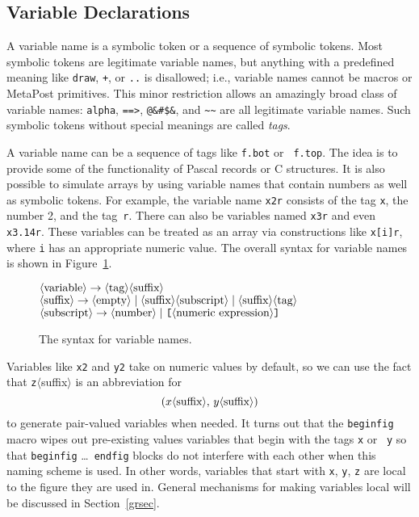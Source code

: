 \documentclass{article} %
\newcommand\descr[1]{{\langle\hbox{#1}\rangle}}
\newcommand\invisgap{\nobreak\hskip0pt\relax}
\newcommand\tdescr[1]{$\langle$\invisgap#1\invisgap$\rangle$}
\begin{document}
\subsection{Variable Declarations}
\label{vardecl}

A variable name is a symbolic token or a sequence of symbolic tokens.
Most symbolic tokens are legitimate variable names, but anything with a
predefined meaning like {\tt draw}, {\tt +}, or {\tt ..} is disallowed;
i.e., variable names cannot be macros or MetaPost primitives.  This
minor restriction allows an amazingly broad class of variable names:
{\tt alpha}, \verb|==>|, \verb|@&#$&|, and \verb|~~| are all legitimate
variable names.  Such symbolic tokens without special meanings are
called {\em tags}.

A variable name can be a sequence of tags like {\tt f.bot} or {\tt
f.top}.  The idea is to provide some of the functionality of Pascal
records or C structures.  It is also possible to simulate arrays by
using variable names that contain numbers as well as symbolic tokens.
For example, the variable name {\tt x2r} consists of the tag {\tt x},
the number 2, and the tag~{\tt r}.  There can also be variables named
{\tt x3r} and even {\tt x3.14r}.  These variables can be treated as an
array via constructions like {\tt x[i]r}, where {\tt i}
has an appropriate numeric value.  The overall syntax for variable names
is shown in Figure~\ref{syvar}.

\begin{figure}[htp]
\begin{ctabbing}
$\tt \descr{variable} \rightarrow \descr{tag}\descr{suffix}$\\
$\tt \descr{suffix} \rightarrow \descr{empty} \;|\;
        \descr{suffix}\descr{subscript} \;|\; \descr{suffix}\descr{tag}$\\
$\tt \descr{subscript} \rightarrow \descr{number} \;|\;
        \hbox{\tt [}\descr{numeric expression}\hbox{\tt ]}$
\end{ctabbing}
\caption{The syntax for variable names.}
\index{suffix?\tdescr{suffix}}\index{subscript?\tdescr{subscript}}
\label{syvar}
\end{figure}

Variables like {\tt x2} and {\tt y2} take on numeric values by default, so we
can use the fact that {\tt z}\tdescr{suffix} is an abbreviation for\label{Dzconv}
$$ (x\descr{suffix},\, y\descr{suffix}) $$
to generate pair-valued variables when needed.  It turns out that the
{\tt beginfig} macro wipes out
pre-existing values variables that begin with the tags {\tt x} or {\tt
y} so that {\tt beginfig} \ldots\ {\tt endfig} blocks do not interfere
with each other when this naming scheme is used.  In other words,
variables that start with {\tt x}, {\tt y}, {\tt z} are
local to the figure they are used
in.  General mechanisms for making variables local will be discussed in
Section~\ref{grsec}.
\end{document}

